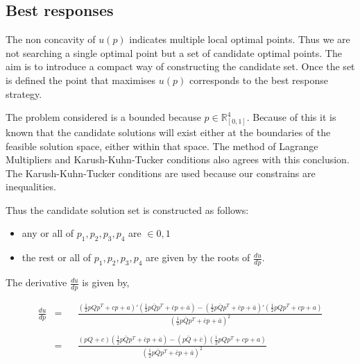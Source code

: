 \documentclass[10pt]{article}
\newcommand{\R}{\mathbb{R}}
\begin{document}
\subsection{Best responses}

The non concavity of \(u(p)\) indicates multiple local optimal points. Thus we
are not searching a single optimal point but a set of candidate optimal points.
The aim is to introduce a compact way of constructing the candidate set. Once
the set is defined the point that maximises \(u(p)\) corresponds to the best
response strategy.

The problem considered is a bounded because \(p \in \R^4_{[0, 1]}\). Because of
this it is known that the candidate solutions will exist either at the boundaries
of the feasible solution space, either within that space. The method of Lagrange
Multipliers and Karush-Kuhn-Tucker conditions also agrees with this conclusion. %
The Karush-Kuhn-Tucker conditions are used because our constrains are inequalities.

Thus the candidate solution set is constructed as follows:

\begin{itemize}
    \item any or all of \(p_1, p_2, p_3, p_4\) are \(\in {0, 1}\)
    \item the rest or all of \(p_1, p_2, p_3, p_4\) are given by the roots of \(\frac{du}{dp}\).
\end{itemize}

The derivative \(\frac{du}{dp}\) is given by,

\begin{equation}\label{eq:derivative_of_quadratic}
    \begin{aligned}
     \frac{du}{dp} & = && \frac{(  \frac{1}{2}p  Q  p^T + c p + a)'
      (  \frac{1}{2} p  \bar{Q}  p^T + \bar{c}  p + \bar{a}) - 
      (  \frac{1}{2} p  \bar{Q}  p^T + \bar{c}  p + \bar{a})'
      (  \frac{1}{2} p  Q  p^T + c p + a)}
      {(  \frac{1}{2} p  \bar{Q}  p^T + \bar{c}  p + \bar{a})^2} \\
      \\
    & = && \frac{(pQ + c) ( \frac{1}{2} p  \bar{Q}  p^T + \bar{c}  p + \bar{a}) 
    - (p\bar{Q} + \bar{c})( \frac{1}{2} p  Q  p^T + c p + a)}
      {( \frac{1}{2} p  \bar{Q}  p^T + \bar{c}  p + \bar{a})^2} \\
    \end{aligned}
\end{equation}
\end{document}
